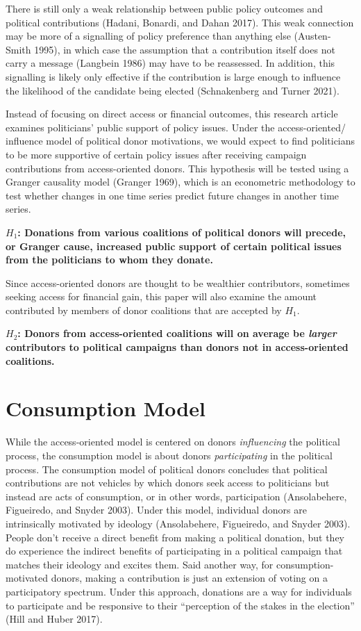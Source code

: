 \documentclass[12pt,]{article}
\begin{document}
There is still only a weak relationship between public policy outcomes
and political contributions (Hadani, Bonardi, and Dahan 2017). This weak
connection may be more of a signalling of policy preference than
anything else (Austen-Smith 1995), in which case the assumption that a
contribution itself does not carry a message (Langbein 1986) may have to
be reassessed. In addition, this signalling is likely only effective if
the contribution is large enough to influence the likelihood of the
candidate being elected (Schnakenberg and Turner 2021).

Instead of focusing on direct access or financial outcomes, this
research article examines politicians' public support of policy issues.
Under the access-oriented/ influence model of political donor
motivations, we would expect to find politicians to be more supportive
of certain policy issues after receiving campaign contributions from
access-oriented donors. This hypothesis will be tested using a Granger
causality model (Granger 1969), which is an econometric methodology to
test whether changes in one time series predict future changes in
another time series.

\textbf{\(H_{1}\): Donations from various coalitions of political donors
will precede, or Granger cause, increased public support of certain
political issues from the politicians to whom they donate.}

Since access-oriented donors are thought to be wealthier contributors,
sometimes seeking access for financial gain, this paper will also
examine the amount contributed by members of donor coalitions that are
accepted by \(H_{1}\).

\textbf{\(H_{2}\): Donors from access-oriented coalitions will on
average be \emph{larger} contributors to political campaigns than donors
not in access-oriented coalitions.}

\hypertarget{consumption-model}{%
\section{Consumption Model}\label{consumption-model}}

While the access-oriented model is centered on donors \emph{influencing}
the political process, the consumption model is about donors
\emph{participating} in the political process. The consumption model of
political donors concludes that political contributions are not vehicles
by which donors seek access to politicians but instead are acts of
consumption, or in other words, participation (Ansolabehere, Figueiredo,
and Snyder 2003). Under this model, individual donors are intrinsically
motivated by ideology (Ansolabehere, Figueiredo, and Snyder 2003).
People don't receive a direct benefit from making a political donation,
but they do experience the indirect benefits of participating in a
political campaign that matches their ideology and excites them. Said
another way, for consumption-motivated donors, making a contribution is
just an extension of voting on a participatory spectrum. Under this
approach, donations are a way for individuals to participate and be
responsive to their ``perception of the stakes in the election'' (Hill
and Huber 2017).
\end{document}
